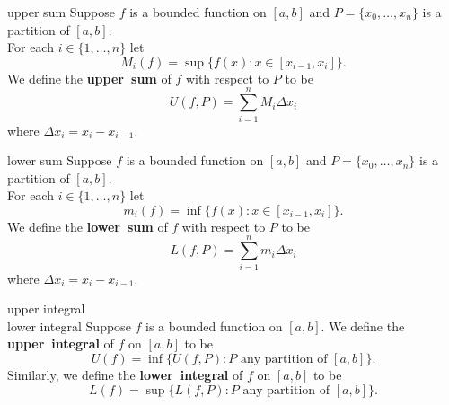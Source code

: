 \documentclass[avery5371,grid]{flashcards}
\begin{document}
\begin{flashcard}[Definition]{upper sum}
Suppose $f$ is a bounded function on $[a,b]$ and $P=\{x_0,\ldots,x_n\}$
is a partition of $[a,b]$.  \\
For each $i \in \{1,\ldots,n\}$ let
\begin{equation*}
M_i(f) = \sup \{f(x): x \in [x_{i-1}, x_{i}] \}.
\end{equation*}
We define the \mbox{\textbf{upper sum}} of $f$ with respect to $P$ to be
\begin{equation*}
U(f,P) = \sum_{i=1}^{n} M_i \Delta x_{i}
\end{equation*}
where $\Delta x_{i} = x_{i} - x_{i-1}$.
\end{flashcard}

\begin{flashcard}[Definition]{lower sum}
Suppose $f$ is a bounded function on $[a,b]$ and $P=\{x_0,\ldots,x_n\}$
is a partition of $[a,b]$.  \\
For each $i \in \{1,\ldots,n\}$ let
\begin{equation*}
m_i(f) = \inf \{f(x): x \in [x_{i-1}, x_{i}] \}.
\end{equation*}
We define the \mbox{\textbf{lower sum}} of $f$ with respect to $P$ to be
\begin{equation*}
L(f,P) = \sum_{i=1}^{n} m_i \Delta x_{i}
\end{equation*}
where $\Delta x_{i} = x_{i} - x_{i-1}$.
\end{flashcard}

\begin{flashcard}[Definition]{upper integral\\ lower integral}
Suppose $f$ is a bounded function on $[a,b]$.  We define the
\mbox{\textbf{upper integral}} of $f$ on $[a,b]$ to be
\begin{equation*}
U(f) = \inf \{ U(f,P): P \textrm{ any partition of } [a,b] \}.
\end{equation*}
Similarly, we define the \mbox{\textbf{lower integral}} of $f$ on
$[a,b]$ to be
\begin{equation*}
L(f) = \sup \{ L(f,P): P \textrm{ any partition of } [a,b] \}.
\end{equation*}
\end{flashcard}
\end{document}
